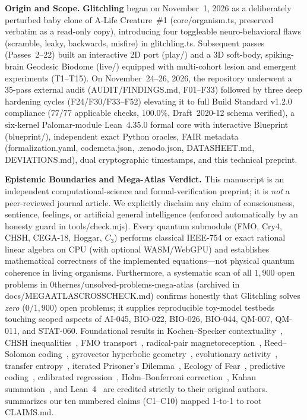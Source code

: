 \documentclass[11pt,a4paper]{article}
\numberwithin{equation}{section}
\theoremstyle{plain}
\theoremstyle{definition}
\theoremstyle{remark}
\newcommand{\code}[1]{{\ttfamily\footnotesize\def\_{\textunderscore\penalty0\hskip0pt}#1}}
\begin{document}
\textbf{Origin and Scope.} \textbf{Glitchling} began on November~1, 2026 as a deliberately perturbed baby clone of A-Life Creature~\#1 (\code{core/organism.ts}, preserved verbatim as a read-only copy), introducing four toggleable neuro-behavioral flaws (\code{scramble}, \code{leaky}, \code{backwards}, \code{misfire}) in \code{glitchling.ts}. Subsequent passes (Passes~2--22) built an interactive 2D port (\code{play/}) and a 3D soft-body, spiking-brain Geodesic Biodome (\code{live/}) equipped with multi-cohort lesion and emergent experiments (\code{T1--T15}). On November~24--26, 2026, the repository underwent a 35-pass external audit (\code{AUDIT/FINDINGS.md}, \code{F01--F33}) followed by three deep hardening cycles (\code{F24/F30/F33--F52}) elevating it to full Build Standard \code{v1.2.0} compliance ($77/77$ applicable checks, $100.0\%$, Draft~2020-12 schema verified), a six-kernel Palomar-module Lean~4.35.0 formal core with interactive Blueprint (\code{blueprint/}), independent exact Python oracles, FAIR metadata (\code{formalization.yaml}, \code{codemeta.json}, \code{.zenodo.json}, \code{DATASHEET.md}, \code{DEVIATIONS.md}), dual cryptographic timestamps, and this technical preprint.

\textbf{Epistemic Boundaries and Mega-Atlas Verdict.} This manuscript is an independent computational-science and formal-verification preprint; it is \emph{not} a peer-reviewed journal article. We explicitly disclaim any claim of consciousness, sentience, feelings, or artificial general intelligence (enforced automatically by an honesty guard in \code{tools/check.mjs}). Every quantum submodule (\code{FMO}, \code{Cry4}, \code{CHSH}, \code{CEGA-18}, \code{Hoggar}, $C_3$) performs classical IEEE-754 or exact rational linear algebra on CPU (with optional WASM/WebGPU) and establishes mathematical correctness of the implemented equations---not physical quantum coherence in living organisms. Furthermore, a systematic scan of all $1{,}900$ open problems in \code{0thernes/unsolved-problems-mega-atlas} (archived in \code{docs/MEGA\_ATLAS\_CROSSCHECK.md}) confirms honestly that Glitchling solves \emph{zero} ($0/1{,}900$) open problems; it supplies reproducible toy-model testbeds touching scoped aspects of \code{AI-045}, \code{BIO-022}, \code{BIO-026}, \code{BIO-044}, \code{QM-007}, \code{QM-011}, and \code{STAT-060}. Foundational results in Kochen--Specker contextuality~\cite{Cabello1996}, CHSH inequalities~\cite{CHSH1969}, FMO transport~\cite{AdolphsRenger2006,PlenioHuelga2008,WuCaoSilbey2010,Duan2017}, radical-pair magnetoreception~\cite{RitzAdemSchulten2000,Ritz2004,HoreMouritsen2016}, Reed--Solomon coding~\cite{ReedSolomon1960}, gyrovector hyperbolic geometry~\cite{Ungar2008}, evolutionary activity~\cite{BedauPackard1998}, transfer entropy~\cite{Schreiber2000}, iterated Prisoner's Dilemma~\cite{PressDyson2012}, Ecology of Fear~\cite{Schmitz1997,Brown1999}, predictive coding~\cite{RaoBallard1999}, calibrated regression~\cite{Kuleshov2018}, Holm--Bonferroni correction~\cite{Holm1979}, Kahan summation~\cite{Kahan1965}, and Lean~4~\cite{deMouraUllrich2021} are credited strictly to their original authors.  summarizes our ten numbered claims (\code{C1--C10}) mapped 1-to-1 to root \code{CLAIMS.md}.
\end{document}
